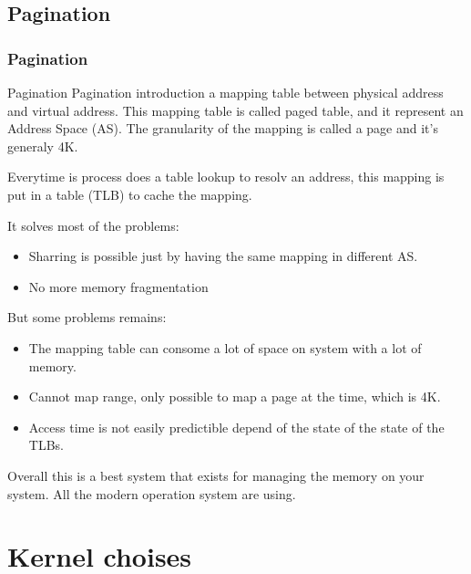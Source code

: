 \subsection{Pagination}
\begin{frame}
        \frametitle{Pagination}
        
        \begin{block}{Pagination}
        Pagination introduction a mapping table between physical address and virtual address.
        This mapping table is called paged table, and it represent an Address Space (AS).
        The granularity of the mapping is called a page and it's generaly 4K.


        Everytime is process does a table lookup to resolv an address, this mapping is put
        in a table (TLB) to cache the mapping.
        \end{block}
        
        It solves most of the problems:
        \begin{itemize}
                \item Sharring is possible just by having the same mapping in different AS.
                \item No more memory fragmentation
        \end{itemize}

        But some problems remains:
        \begin{itemize}
                \item The mapping table can consome a lot of space on system with a lot of memory.
                \item Cannot map range, only possible to map a page at the time, which is 4K.
                \item Access time is not easily predictible depend of the state of the state of the TLBs.
        \end{itemize}

        Overall this is a best system that exists for managing the memory on your system.
        All the modern operation system are using.

\end{frame}

\section{Kernel choises}
